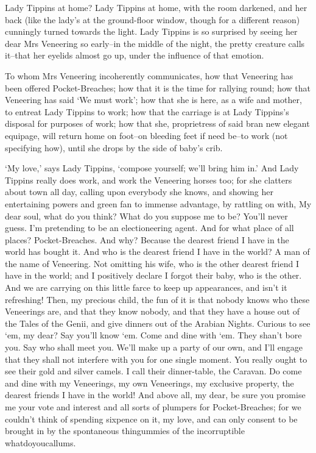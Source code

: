 Lady Tippins at home? Lady Tippins at home, with the room darkened,
and her back (like the lady’s at the ground-floor window, though for a
different reason) cunningly turned towards the light. Lady Tippins is
so surprised by seeing her dear Mrs Veneering so early--in the middle of
the night, the pretty creature calls it--that her eyelids almost go up,
under the influence of that emotion.

To whom Mrs Veneering incoherently communicates, how that Veneering
has been offered Pocket-Breaches; how that it is the time for rallying
round; how that Veneering has said ‘We must work’; how that she is here,
as a wife and mother, to entreat Lady Tippins to work; how that the
carriage is at Lady Tippins’s disposal for purposes of work; how that
she, proprietress of said bran new elegant equipage, will return home on
foot--on bleeding feet if need be--to work (not specifying how), until
she drops by the side of baby’s crib.

‘My love,’ says Lady Tippins, ‘compose yourself; we’ll bring him in.’
And Lady Tippins really does work, and work the Veneering horses too;
for she clatters about town all day, calling upon everybody she knows,
and showing her entertaining powers and green fan to immense advantage,
by rattling on with, My dear soul, what do you think? What do
you suppose me to be? You’ll never guess. I’m pretending to be an
electioneering agent. And for what place of all places? Pocket-Breaches.
And why? Because the dearest friend I have in the world has bought it.
And who is the dearest friend I have in the world? A man of the name of
Veneering. Not omitting his wife, who is the other dearest friend I have
in the world; and I positively declare I forgot their baby, who is the
other. And we are carrying on this little farce to keep up appearances,
and isn’t it refreshing! Then, my precious child, the fun of it is that
nobody knows who these Veneerings are, and that they know nobody, and
that they have a house out of the Tales of the Genii, and give dinners
out of the Arabian Nights. Curious to see ‘em, my dear? Say you’ll know
‘em. Come and dine with ‘em. They shan’t bore you. Say who shall meet
you. We’ll make up a party of our own, and I’ll engage that they shall
not interfere with you for one single moment. You really ought to see
their gold and silver camels. I call their dinner-table, the Caravan.
Do come and dine with my Veneerings, my own Veneerings, my exclusive
property, the dearest friends I have in the world! And above all, my
dear, be sure you promise me your vote and interest and all sorts of
plumpers for Pocket-Breaches; for we couldn’t think of spending sixpence
on it, my love, and can only consent to be brought in by the spontaneous
thingummies of the incorruptible whatdoyoucallums.


